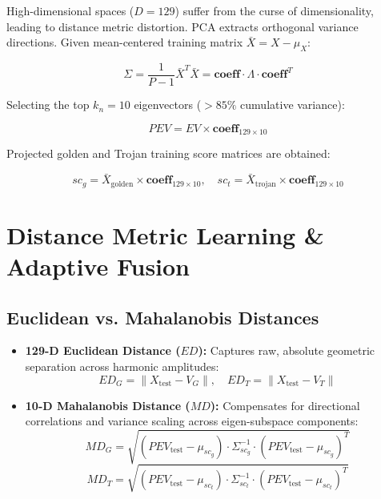 \documentclass[11pt,a4paper,oneside]{book}
\begin{document}
High-dimensional spaces ($D = 129$) suffer from the curse of dimensionality, leading to distance metric distortion. PCA extracts orthogonal variance directions. Given mean-centered training matrix $\bar{X} = X - \mu_X$:

\begin{equation}
\Sigma = \frac{1}{P-1} \bar{X}^T \bar{X} = \mathbf{coeff} \cdot \Lambda \cdot \mathbf{coeff}^T
\end{equation}

Selecting the top $k_n = 10$ eigenvectors ($>85\%$ cumulative variance):

\begin{equation}
PEV = EV \times \mathbf{coeff}_{129 \times 10}
\end{equation}

Projected golden and Trojan training score matrices are obtained:

\begin{equation}
sc_g = \bar{X}_{\text{golden}} \times \mathbf{coeff}_{129 \times 10}, \quad sc_t = \bar{X}_{\text{trojan}} \times \mathbf{coeff}_{129 \times 10}
\end{equation}

\chapter{Distance Metric Learning \& Adaptive Fusion}

\section{Euclidean vs. Mahalanobis Distances}

\begin{itemize}[leftmargin=1.5em]
  \item \textbf{129-D Euclidean Distance ($ED$):} Captures raw, absolute geometric separation across harmonic amplitudes:
  \begin{equation}
  ED_G = \|X_{\text{test}} - V_G\|, \quad ED_T = \|X_{\text{test}} - V_T\|
  \end{equation}
  \item \textbf{10-D Mahalanobis Distance ($MD$):} Compensates for directional correlations and variance scaling across eigen-subspace components:
  \begin{equation}
  MD_G = \sqrt{(PEV_{\text{test}} - \mu_{sc_g}) \cdot \Sigma_{sc_g}^{-1} \cdot (PEV_{\text{test}} - \mu_{sc_g})^T}
  \end{equation}
  \begin{equation}
  MD_T = \sqrt{(PEV_{\text{test}} - \mu_{sc_t}) \cdot \Sigma_{sc_t}^{-1} \cdot (PEV_{\text{test}} - \mu_{sc_t})^T}
  \end{equation}
\end{itemize}
\end{document}
